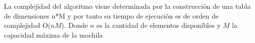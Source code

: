 La complejidad del algoritmo viene determinada por la construcción de una tabla de dimensiones n*M y por tanto su tiempo de ejecución es de orden de complejidad O($nM$). Donde $n$ es la cantidad de elementos disponibles y $M$ la capacidad máxima de la mochila